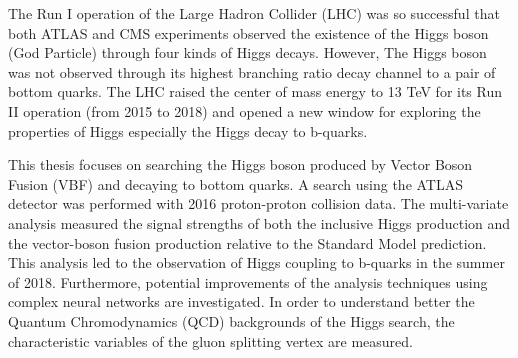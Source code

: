 The Run I operation of the Large Hadron Collider (LHC) was so successful that both ATLAS and CMS experiments observed the existence of the Higgs boson (God Particle) through four kinds of Higgs decays. However, The Higgs boson was not observed through its highest branching ratio decay channel to a pair of bottom quarks. The LHC raised the center of mass energy to 13 TeV for its Run II operation (from 2015 to 2018) and opened a new window for exploring the properties of Higgs especially the Higgs decay to b-quarks.

This thesis focuses on searching the Higgs boson produced by Vector Boson Fusion (VBF) and decaying to bottom quarks. A search using the ATLAS detector was performed with 2016 proton-proton collision data. The multi-variate analysis measured the signal strengths of both the inclusive Higgs production and the vector-boson fusion production relative to the Standard Model prediction. This analysis led to the observation of Higgs coupling to b-quarks in the summer of 2018. Furthermore, potential improvements of the analysis techniques using complex neural networks are investigated. In order to understand better the Quantum Chromodynamics (QCD) backgrounds of the Higgs search, the characteristic variables of the gluon splitting vertex are measured.
